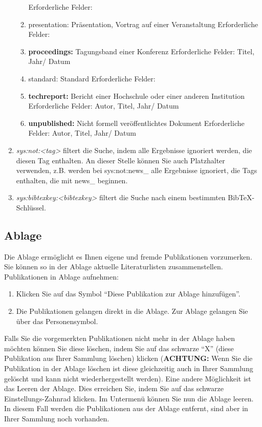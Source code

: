 \documentclass[a4paper,11pt,twoside]{scrbook}
\begin{document}
\begin{enumerate}
\begin{enumerate}
        Erforderliche Felder:
        \item presentation: Präsentation, Vortrag auf einer Veranstaltung\newline 
        Erforderliche Felder:
        \item \textbf{proceedings:} Tagungsband einer Konferenz\newline
        Erforderliche Felder: Titel, Jahr/ Datum
        \item standard: Standard\newline 
        Erforderliche Felder:
        \item \textbf{techreport:} Bericht einer Hochschule oder einer anderen Institution\newline
        Erforderliche Felder: Autor, Titel, Jahr/ Datum
        \item \textbf{unpublished:} Nicht formell veröffentlichtes Dokument\newline 
        Erforderliche Felder: Autor, Titel, Jahr/ Datum
    \end{enumerate}
    \item \textit{sys:not:<tag>} filtert die Suche, indem alle Ergebnisse ignoriert werden, die diesen Tag enthalten. An dieser Stelle können Sie auch Platzhalter verwenden, z.B. werden bei sys:not:news\_ 
    alle Ergebnisse ignoriert, die Tags enthalten, die mit news\_
    beginnen.
    \item \textit{sys:bibtexkey:<bibtexkey>} filtert die Suche nach einem bestimmten BibTeX-Schlüssel.
\end{enumerate}
\hypertarget{Ablage}{\subsection{Ablage}}
Die Ablage ermöglicht es Ihnen eigene und fremde Publikationen vorzumerken. Sie können so in der Ablage aktuelle Literaturlisten zusammenstellen.
\newline
Publikationen in Ablage aufnehmen: %
\begin{enumerate}
    \item Klicken Sie auf das Symbol \enquote{Diese Publikation zur Ablage hinzufügen}.
    \item Die Publikationen gelangen direkt in die Ablage. Zur Ablage gelangen Sie über das Personensymbol.
\end{enumerate}
Falls Sie die vorgemerkten Publikationen nicht mehr in der Ablage haben möchten können Sie diese löschen, indem Sie auf das schwarze \enquote{X} (diese Publikation aus Ihrer Sammlung löschen) klicken (\textbf{ACHTUNG:} Wenn Sie die Publikation in der Ablage löschen ist diese gleichzeitig auch in Ihrer Sammlung gelöscht und kann nicht wiederhergestellt werden).
Eine andere Möglichkeit ist das Leeren der Ablage. Dies erreichen Sie, indem Sie auf das schwarze Einstellungs-Zahnrad klicken. Im Untermenü können Sie nun die Ablage leeren. In diesem Fall werden die Publikationen aus der Ablage entfernt, sind aber in Ihrer Sammlung noch vorhanden.
\newpage
\end{document}
